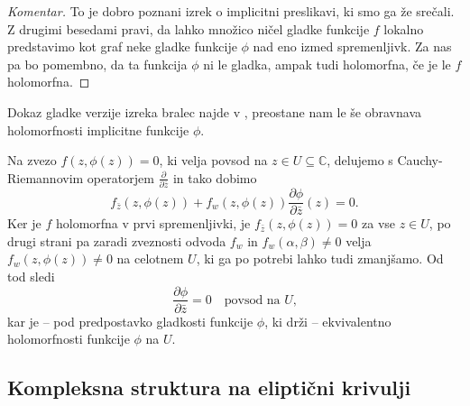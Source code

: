 \documentclass[mat1]{fmfdelo}
\numberwithin{equation}{section}
\newcommand{\C}{\mathbb C}
\newcommand{\pdv}[2][]{\frac{\partial#1}{\partial#2}}
\theoremstyle{definition}
\newenvironment{komentar}[1][Komentar]{\begin{proof}[#1]\let\qed\relax}{\end{proof}}
\begin{document}
\begin{komentar}
    To je dobro poznani izrek o implicitni preslikavi, ki smo ga že srečali. Z drugimi besedami pravi, da lahko množico ničel gladke funkcije $f$ lokalno predstavimo kot graf neke gladke funkcije $\phi$ nad eno izmed spremenljivk. Za nas pa bo pomembno, da ta funkcija $\phi$ ni le gladka, ampak tudi holomorfna, če je le $f$ holomorfna. 
\end{komentar}

\begin{dokaz}
    Dokaz gladke verzije izreka bralec najde v \cite[Izrek 14]{Globevnik}, preostane nam le še obravnava holomorfnosti implicitne funkcije $\phi$.

    Na zvezo $f(z, \phi(z)) = 0$, ki velja povsod na $z \in U \subseteq \C$, delujemo s Cauchy-Riemannovim operatorjem $\pdv{\bar{z}}$ in tako dobimo
    \[
        f_{\bar{z}}(z, \phi(z)) + f_{w}(z, \phi(z)) \pdv[\phi]{\bar{z}}(z) = 0.  
    \] 
    Ker je $f$ holomorfna v prvi spremenljivki, je $f_{\bar{z}}(z, \phi(z)) = 0$ za vse $z \in U$, po drugi strani pa zaradi zveznosti odvoda $f_w$ in $f_w(\alpha, \beta) \neq 0$ velja $f_{w}(z, \phi(z)) \neq 0$ na celotnem $U$, ki ga po potrebi lahko tudi zmanjšamo. Od tod sledi
    \[
        \pdv[\phi]{\bar{z}} = 0 \quad \text {povsod na $U$,}  
    \]
    kar je -- pod predpostavko gladkosti funkcije $\phi$, ki drži -- ekvivalentno holomorfnosti funkcije $\phi$ na $U$. 
\end{dokaz}






\subsection{Kompleksna struktura na eliptični krivulji}
\label{Kompleksna struktura na elipticni krivulji}
\end{document}
